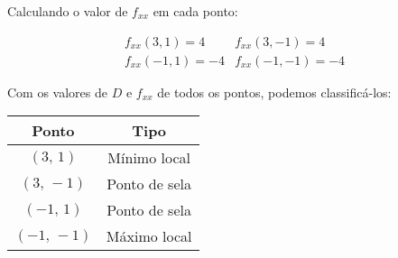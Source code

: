 Calculando o valor de $f_{xx}$ em cada ponto:

$$
\begin{array}{cc}
	f_{xx}( 3, 1) =  4 & f_{xx}( 3, -1) =  4 \\
	f_{xx}(-1, 1) = -4 & f_{xx}(-1, -1) = -4
\end{array}
$$

Com os valores de $D$ e $f_{xx}$ de todos os pontos, podemos
classificá-los:

\begin{center}
	\begin{tabular}{|c|c|}
		\hline
		Ponto         & Tipo \\ \hline
		$( 3, \,  1)$  & Mínimo local  \\ \hline
		$( 3, \, -1)$  & Ponto de sela \\ \hline
		$(-1, \,  1)$  & Ponto de sela \\ \hline
		$(-1, \, -1)$  & Máximo local  \\ \hline
	\end{tabular}
\end{center}